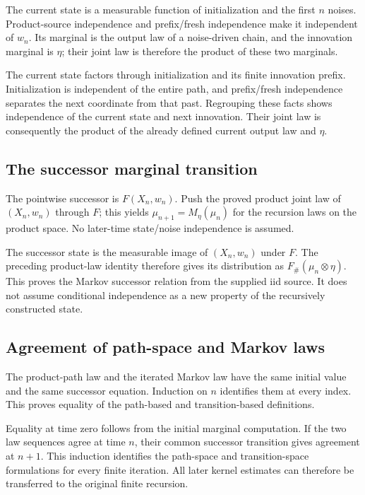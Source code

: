 \documentclass[11pt,a4paper]{article}
\begin{document}
The current state is a measurable function of initialization and the first \(n\) noises. Product-source independence and prefix/\allowbreak{}fresh independence make it independent of \(w_n\). Its marginal is the output law of a noise-driven chain, and the innovation marginal is \(\eta\); their joint law is therefore the product of these two marginals.



The current state factors through initialization and its finite innovation prefix. Initialization is independent of the entire path, and prefix/\allowbreak{}fresh independence separates the next coordinate from that past. Regrouping these facts shows independence of the current state and next innovation. Their joint law is consequently the product of the already defined current output law and \(\eta\).


\subsection{\texorpdfstring{The successor marginal transition}{The successor marginal transition}}


The pointwise successor is \(F(X_n,w_n)\). Push the proved product joint law of \((X_n,w_n)\) through \(F\); this yields \(\mu_{n+1}=M_\eta(\mu_n)\) for the recursion laws on the product space. No later-time state/\allowbreak{}noise independence is assumed.



The successor state is the measurable image of \((X_n,w_n)\) under \(F\). The preceding product-law identity therefore gives its distribution as \(F_\#(\mu_n\otimes\eta)\). This proves the Markov successor relation from the supplied iid source. It does not assume conditional independence as a new property of the recursively constructed state.


\subsection{\texorpdfstring{Agreement of path-space and Markov laws}{Agreement of path-space and Markov laws}}


The product-path law and the iterated Markov law have the same initial value and the same successor equation. Induction on \(n\) identifies them at every index. This proves equality of the path-based and transition-based definitions.



Equality at time zero follows from the initial marginal computation. If the two law sequences agree at time \(n\), their common successor transition gives agreement at \(n+1\). This induction identifies the path-space and transition-space formulations for every finite iteration. All later kernel estimates can therefore be transferred to the original finite recursion.
\end{document}
